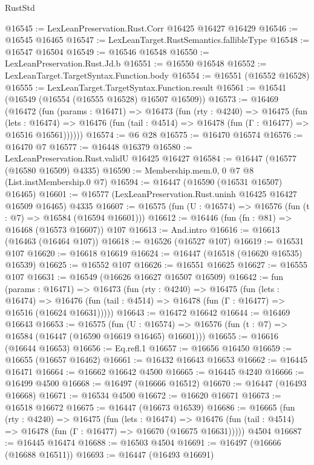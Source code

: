 \begin{lexlean}{RustStd}
\begin{coremodule}
{\begin{coremodule}
{{{{{{{{{{{{{{{{{{{{{{{{{{{{{{{{{{{{{{{{{{{{{{{{{{{{{{{@16545 := LexLeanPreservation.Rust.Corr @16425 @16427 @16429
@16546 := @16545 @16465
@16547 := LexLeanTarget.RustSemantics.fallibleType
@16548 := @16547 @16504
@16549 := @16546 @16548
@16550 := LexLeanPreservation.Rust.Jd.b
@16551 := @16550 @16548
@16552 := LexLeanTarget.TargetSyntax.Function.body
@16554 := @16551 (@16552 @16528)
@16555 := LexLeanTarget.TargetSyntax.Function.result
@16561 := @16541 (@16549 (@16554 (@16555 @16528) @16507 @16509))
@16573 := @16469
    (@16472
      (fun (params : @16471) =>
      @16473
        (fun (rty : @4240) =>
        @16475
          (fun (lets : @16474) =>
          @16476 (fun (tail : @4514) => @16478 (fun (Γ : @16477) => @16516 @16561))))))
@16574 := @6 @28
@16575 := @16470 @16574
@16576 := @16470 @7
@16577 := @16448 @16379
@16580 := LexLeanPreservation.Rust.validU @16425 @16427
@16584 := @16447 (@16577 (@16580 @16509) @4335)
@16590 := Membership.mem.{0, 0} @7 @8 (List.instMembership.{0} @7)
@16594 := @16447 (@16590 (@16531 @16507) @16465)
@16601 := @16577 (LexLeanPreservation.Rust.uninh @16425 @16427 @16509 @16465) @4335
@16607 := @16575 (fun (U : @16574) => @16576 (fun (t : @7) => @16584 (@16594 @16601)))
@16612 := @16446 (fun (fn : @81) => @16468 (@16573 @16607)) @107
@16613 := And.intro
@16616 := @16613 (@16463 (@16464 @107))
@16618 := @16526 (@16527 @107)
@16619 := @16531 @107
@16620 := @16618 @16619
@16624 := @16447 (@16518 (@16620 @16535) @16539)
@16625 := @16552 @107
@16626 := @16551 @16625
@16627 := @16555 @107
@16631 := @16549 (@16626 @16627 @16507 @16509)
@16642 := fun (params : @16471) =>
  @16473
    (fun (rty : @4240) =>
    @16475
      (fun (lets : @16474) =>
      @16476 (fun (tail : @4514) => @16478 (fun (Γ : @16477) => @16516 (@16624 @16631)))))
@16643 := @16472 @16642
@16644 := @16469 @16643
@16653 := @16575
    (fun (U : @16574) => @16576 (fun (t : @7) => @16584 (@16447 (@16590 @16619 @16465) @16601)))
@16655 := @16616 (@16644 @16653)
@16656 := Eq.refl.{1}
@16657 := @16656 @16450
@16659 := @16655 (@16657 @16462)
@16661 := @16432 @16643 @16653
@16662 := @16445 @16471
@16664 := @16662 @16642 @4500
@16665 := @16445 @4240
@16666 := @16499 @4500
@16668 := @16497 (@16666 @16512)
@16670 := @16447 (@16493 @16668)
@16671 := @16534 @4500
@16672 := @16620 @16671
@16673 := @16518 @16672
@16675 := @16447 (@16673 @16539)
@16686 := @16665
    (fun (rty : @4240) =>
    @16475
      (fun (lets : @16474) =>
      @16476 (fun (tail : @4514) => @16478 (fun (Γ : @16477) => @16670 (@16675 @16631)))))
    @4504
@16687 := @16445 @16474
@16688 := @16503 @4504
@16691 := @16497 (@16666 (@16688 @16511))
@16693 := @16447 (@16493 @16691)
}}}}}}}}}}}}}}}}}}}}}}}}}}}}}}}}}}}}}}}}}}}}}}}}}}}}}}}
\end{coremodule}}
\end{coremodule}
\end{lexlean}

